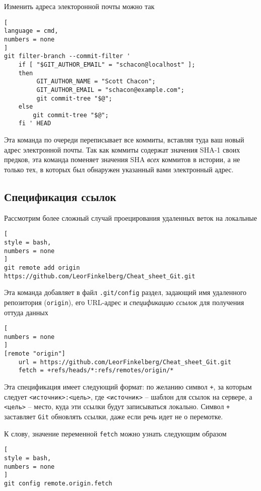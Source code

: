 \documentclass[%
	11pt,
	a4paper,
	utf8,
		]{article}
\begin{document}
Изменить адреса электоронной почты можно так

\begin{lstlisting}[
language = cmd,
numbers = none
]
git filter-branch --commit-filter '
    if [ "$GIT_AUTHOR_EMAIL" = "schacon@localhost" ];
    then
         GIT_AUTHOR_NAME = "Scott Chacon";
         GIT_AUTHOR_EMAIL = "schacon@example.com";
         git commit-tree "$@";
    else
        git commit-tree "$@";
    fi ' HEAD
\end{lstlisting}

Эта команда по очереди переписывает все коммиты, вставляя туда ваш новый адрес электронной почты. Так как коммиты содержат значения SHA-1 своих предков, эта команда поменяет значения SHA \emph{всех} коммитов в истории, а не только тех, в которых был обнаружен указанный вами электронный адрес.

\subsection{Спецификация ссылок}

Рассмотрим более сложный случай проецирования удаленных веток на локальные
\begin{lstlisting}[
style = bash,
numbers = none
]
git remote add origin https://github.com/LeorFinkelberg/Cheat_sheet_Git.git
\end{lstlisting}

Эта команда добавляет в файл \verb|.git/config| раздел, задающий имя удаленного репозитория (\texttt{origin}), его URL-адрес и \emph{спецификацию ссылок} для получения оттуда данных
\begin{lstlisting}[
numbers = none
]
[remote "origin"]
    url = https://github.com/LeorFinkelberg/Cheat_sheet_Git.git
    fetch = +refs/heads/*:refs/remotes/origin/*
\end{lstlisting}

Эта спецификация имеет следующий формат: по желанию символ \texttt{+}, за которым следует \verb|<источник>:<цель>|, где \verb|<источник>| -- шаблон для ссылок на сервере, а \verb|<цель>| -- место, куда эти ссылки будут записываться локально. Символ \texttt{+} заставляет \texttt{Git} обновлять ссылки, даже если речь идет не о перемотке.

К слову, значение переменной \texttt{fetch} можно узнать следующим образом
\begin{lstlisting}[
style = bash,
numbers = none
]
git config remote.origin.fetch
\end{lstlisting}
\end{document}
